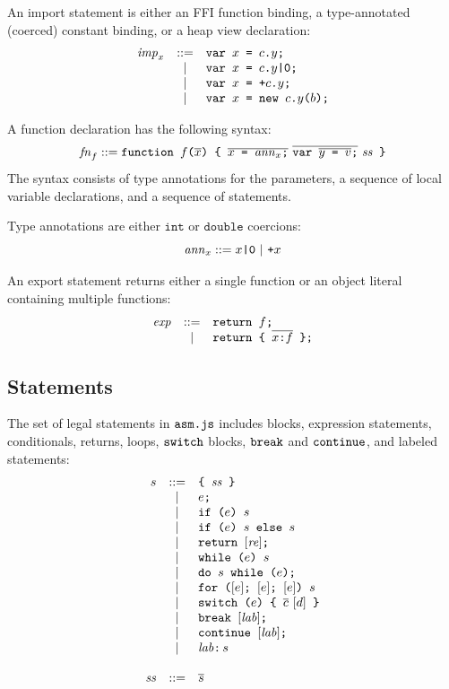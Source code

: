 \documentclass{article}
\newcommand{\funcall}[2]{{#1}\mathjs{(}{#2}\mathjs{)}}
\newcommand{\seq}[1]{\overline{{#1}}}
\newcommand{\mathjs}[1]{\mbox{\texttt{{#1}}}}
\newcommand{\return}[1]{\mathjs{return }{#1}\mathjs{;}}
\newcommand{\fun}[3]{\mathjs{function }{#1}\mathjs{(}{#2}\mathjs{) \char123{} }{#3}\mathjs{ \char125{}}}
\newcommand{\var}[1]{\mathjs{var }{#1}\mathjs{;}}
\newcommand{\while}[2]{\mathjs{while (}{#1}\mathjs{) }{#2}}
\newcommand{\dowhile}[2]{\mathjs{do }{#1}\mathjs{ while (}{#2}\mathjs{);}}
\newcommand{\for}[4]{\mathjs{for (}{#1}\mathjs{; }{#2}\mathjs{; }{#3}\mathjs{) }{#4}}
\newcommand{\switch}[2]{\mathjs{switch (}{#1}\mathjs{) \char123{} }{#2}\mathjs{ \char125{}}}
\newcommand{\brkl}[1]{\mathjs{break }{#1}\mathjs{;}}
\newcommand{\contl}[1]{\mathjs{continue }{#1}\mathjs{;}}
\newcommand{\lab}[2]{{#1}\mathjs{:}\,{#2}}
\newcommand{\ifthen}[2]{\mathjs{if (}{#1}\mathjs{) }{#2}}
\newcommand{\ifthenelse}[3]{\mathjs{if (}{#1}\mathjs{) }{#2}\mathjs{ else }{#3}}
\newcommand{\block}[1]{\mathjs{\char123{} }{#1}\mathjs{ \char125{}}}
\newcommand{\double}{\mathtt{double}}
\newcommand{\todouble}[1]{\mathjs{+}{#1}}
\renewcommand{\int}{\mathtt{int}}
\begin{document}
An import statement is either an FFI function binding, a
type-annotated (coerced) constant binding, or a heap view declaration:
\[
\begin{array}{rcl}
\mathit{imp}_x  & ::= & \var{x \mathjs{ = } c\mathjs{.}y} \\
                &  |  & \var{x \mathjs{ = } c\mathjs{.}y\mathjs{|0}} \\
                &  |  & \var{x \mathjs{ = } \mathjs{+}c\mathjs{.}y} \\
                &  |  & \var{x \mathjs{ = } \mathjs{new }\funcall{c\mathjs{.}y}{b}} \\
\end{array}
\]

A function declaration has the following syntax:
\[
\mathit{fn}_f ::= \fun{f}{\seq{x}}{\seq{x\mathjs{ = }\mathit{ann}_x\mathjs{;}}\ \seq{\var{\seq{y\mathjs{ = }v}}}\ \mathit{ss}}
\]
The syntax consists of type annotations for the parameters, a sequence
of local variable declarations, and a sequence of statements.

Type annotations are either $\int$ or $\double$ coercions:
\[
\mathit{ann}_x ::= x\mathjs{|0} ~|~ \todouble{x}
\]

An export statement returns either a single function or an object
literal containing multiple functions:
\[
\begin{array}{rcl}
\mathit{exp}    & ::= & \return{f} \\
                &  |  & \return{\mathjs{\char123{} } \seq{x \mathjs{:} f} \mathjs{ \char125{}}} \\
\end{array}
\]

\subsection{Statements}

The set of legal statements in $\mathjs{asm.js}$ includes blocks,
expression statements, conditionals, returns, loops, $\mathjs{switch}$
blocks, $\mathjs{break}$ and $\mathjs{continue}$, and labeled
statements:
\[
\begin{array}{rcl}
s & ::= & \block{\mathit{ss}} \\
  &  |  & e\mathjs{;} \\
  &  |  & \ifthen{e}{s} \\
  &  |  & \ifthenelse{e}{s}{s} \\
  &  |  & \return{[\mathit{re}]} \\
  &  |  & \while{e}{s} \\
  &  |  & \dowhile{s}{e} \\
  &  |  & \for{[e]}{[e]}{[e]}{s} \\
  &  |  & \switch{e}{\seq{c}\ [d]} \\
  &  |  & \brkl{[\mathit{lab}]} \\
  &  |  & \contl{[\mathit{lab}]} \\
  &  |  & \lab{\mathit{lab}}{s} \\
\\
\mathit{ss} & ::= & \seq{s} \\
\end{array}
\]
\end{document}
